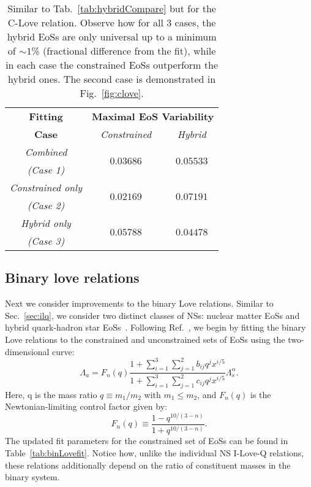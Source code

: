 \documentclass[prd,twocolumn,nofootinbib,superscriptaddress,amsmath,amssymb]{revtex4-1}
\begin{document}
\begin{table}
\centering
\caption{
Similar to Tab.~\ref{tab:hybridCompare} but for the C-Love relation.
Observe how for all 3 cases, the hybrid EoSs are only universal up to a minimum of $\sim1$\% (fractional difference from the fit), while in each case the constrained EoSs outperform the hybrid ones.
The second case is demonstrated in Fig.~\ref{fig:clove}.
}\label{tab:hybridCompareClove}
\begin{tabular}{ c  || c c } 
 \hline
 \hline
 \textbf{Fitting} & \multicolumn{2}{c}{\textbf{Maximal EoS Variability}} \\
 \cline{2-3}
 \textbf{Case} &  \multicolumn{1}{c|}{\emph{Constrained}} & \emph{Hybrid}\\
 \hline
 \emph{Combined} &  \multirow{2}{*}{$0.03686$} & \multirow{2}{*}{$0.05533$}\\
 \emph{(Case 1)} & &\\
 \cline{1-1}
 \emph{Constrained only} & \multirow{2}{*}{$0.02169$} & \multirow{2}{*}{$0.07191$}\\
  \emph{(Case 2)} & &\\
  \cline{1-1}
 \emph{Hybrid only} & \multirow{2}{*}{$0.05788$} & \multirow{2}{*}{$0.04478$}\\
  \emph{(Case 3)} & &\\
  \cline{1-1}
\hline
\hline
\end{tabular}
\end{table}


\subsection{Binary love relations}\label{sec:binary}
Next we consider improvements to the binary Love relations.
Similar to Sec.~\ref{sec:ilq}, we consider two distinct classes of NSs: nuclear matter EoSs and hybrid quark-hadron star EoSs~\cite{Paschalidis2018,Alford:2017qgh,1971SvA....15..347S,Zdunik:2012dj,Alford:2013aca}.
Following Ref.~\cite{Yagi:binLove}, we begin by fitting the binary Love relations to the constrained and unconstrained sets of EoSs using the two-dimensional curve:
\begin{equation}\label{eq:binLovefit}
\Lambda_a=F_n(q) \frac{1+ \sum_{i=1}^3 \sum_{j=1}^2 b_{ij}q^j x^{i/5}}{1 + \sum_{i=1}^3 \sum_{j=1}^2 c_{ij}q^j x^{i/5}} \Lambda_s^{\alpha}.
\end{equation}
Here, q is the mass ratio $q \equiv m_1/m_2$ with $m_1 \leq m_2$, and $F_n(q)$ is the Newtonian-limiting control factor given by:
\begin{equation}\label{eq:control}
F_n(q) \equiv \frac{1-q^{10/(3-n)}}{1+q^{10/(3-n)}}.
\end{equation}
The updated fit parameters for the constrained set of EoSs can be found in Table~\ref{tab:binLovefit}.
Notice how, unlike the individual NS I-Love-Q relations, these relations additionally depend on the ratio of constituent masses in the binary system.
\end{document}
